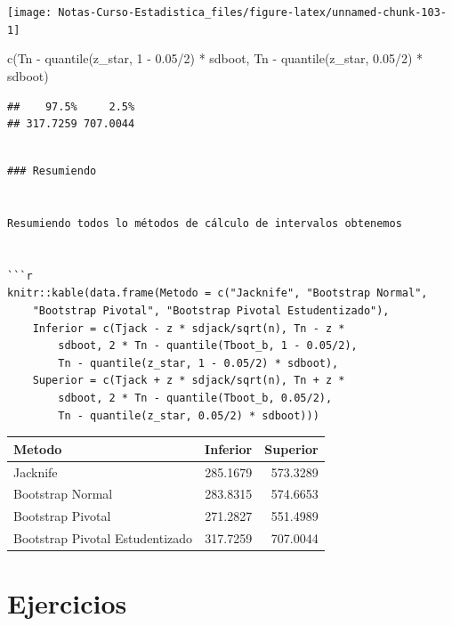 \documentclass[
  12pt,
]{book}
\newenvironment{Shaded}{\begin{snugshade}}{\end{snugshade}}
\newcommand{\DecValTok}[1]{\textcolor[rgb]{0.00,0.00,0.81}{#1}}
\newcommand{\FloatTok}[1]{\textcolor[rgb]{0.00,0.00,0.81}{#1}}
\newcommand{\FunctionTok}[1]{\textcolor[rgb]{0.00,0.00,0.00}{#1}}
\newcommand{\NormalTok}[1]{#1}
\newcommand{\SpecialCharTok}[1]{\textcolor[rgb]{0.00,0.00,0.00}{#1}}
\theoremstyle{definition}
\theoremstyle{definition}
\theoremstyle{definition}
\theoremstyle{remark}
\begin{document}
\begin{center}\texttt{[image: Notas-Curso-Estadistica\_files/figure-latex/unnamed-chunk-103-1]} \end{center}

\begin{Shaded}
\begin{Highlighting}[]
\FunctionTok{c}\NormalTok{(Tn }\SpecialCharTok{{-}} \FunctionTok{quantile}\NormalTok{(z\_star, }\DecValTok{1} \SpecialCharTok{{-}} \FloatTok{0.05}\SpecialCharTok{/}\DecValTok{2}\NormalTok{) }\SpecialCharTok{*}\NormalTok{ sdboot, Tn }\SpecialCharTok{{-}} 
    \FunctionTok{quantile}\NormalTok{(z\_star, }\FloatTok{0.05}\SpecialCharTok{/}\DecValTok{2}\NormalTok{) }\SpecialCharTok{*}\NormalTok{ sdboot)}
\end{Highlighting}
\end{Shaded}

\begin{verbatim}
##    97.5%     2.5% 
## 317.7259 707.0044
\end{verbatim}

\begin{verbatim}

### Resumiendo


Resumiendo todos lo métodos de cálculo de intervalos obtenemos


```r
knitr::kable(data.frame(Metodo = c("Jacknife", "Bootstrap Normal", 
    "Bootstrap Pivotal", "Bootstrap Pivotal Estudentizado"), 
    Inferior = c(Tjack - z * sdjack/sqrt(n), Tn - z * 
        sdboot, 2 * Tn - quantile(Tboot_b, 1 - 0.05/2), 
        Tn - quantile(z_star, 1 - 0.05/2) * sdboot), 
    Superior = c(Tjack + z * sdjack/sqrt(n), Tn + z * 
        sdboot, 2 * Tn - quantile(Tboot_b, 0.05/2), 
        Tn - quantile(z_star, 0.05/2) * sdboot)))
\end{verbatim}

\begin{tabular}{l|r|r}
\hline
Metodo & Inferior & Superior\\
\hline
Jacknife & 285.1679 & 573.3289\\
\hline
Bootstrap Normal & 283.8315 & 574.6653\\
\hline
Bootstrap Pivotal & 271.2827 & 551.4989\\
\hline
Bootstrap Pivotal Estudentizado & 317.7259 & 707.0044\\
\hline
\end{tabular}

\hypertarget{ejercicios-1}{%
\section{Ejercicios}\label{ejercicios-1}}
\end{document}
